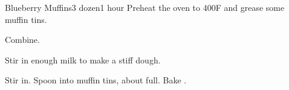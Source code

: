 \documentclass[../Cookbook.tex]{subfiles}
\begin{document}
\begin{recipe}[BlueberryMuffins]{Blueberry Muffins}{3 dozen}{1 hour}
    Preheat the oven to 400\0F and grease some muffin tins.

    Combine.

    Stir in enough milk to make a stiff dough.

    Stir in. Spoon into muffin tins, about  full. Bake .

\end{recipe}
\end{document}
